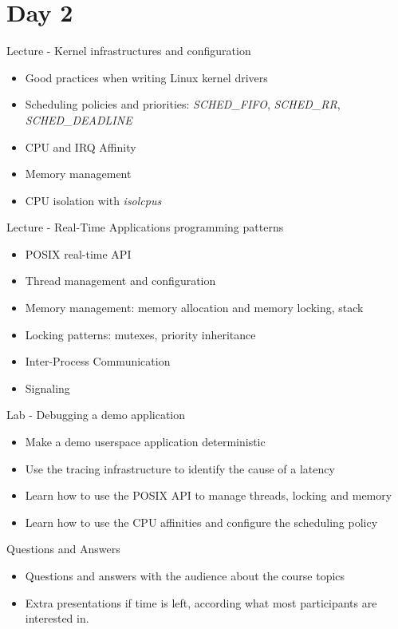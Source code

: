 \documentclass[a4paper,12pt,obeyspaces,spaces,hyphens]{article}
\begin{document}
\section{Day 2}

\feagendaonecolumn
{Lecture - Kernel infrastructures and configuration}
{
  \begin{itemize}
  \item Good practices when writing Linux kernel drivers
  \item Scheduling policies and priorities: {\em SCHED\_FIFO}, {\em
      SCHED\_RR}, {\em SCHED\_DEADLINE}
  \item CPU and IRQ Affinity
  \item Memory management
  \item CPU isolation with {\em isolcpus}
  \end{itemize}
}

\feagendatwocolumn
{Lecture - Real-Time Applications programming patterns}
{
  \begin{itemize}
  \item POSIX real-time API
  \item Thread management and configuration
  \item Memory management: memory allocation and memory locking, stack
  \item Locking patterns: mutexes, priority inheritance
  \item Inter-Process Communication
  \item Signaling
  \end{itemize}
}
{Lab - Debugging a demo application}
{
  \begin{itemize}
  \item Make a demo userspace application deterministic
  \item Use the tracing infrastructure to identify the cause of a latency
  \item Learn how to use the POSIX API to manage threads, locking and memory
  \item Learn how to use the CPU affinities and configure the scheduling policy
  \end{itemize}
}

\feagendaonecolumn
{Questions and Answers}
{
  \begin{itemize}
  \item Questions and answers with the audience about the course topics
  \item Extra presentations if time is left, according what most
        participants are interested in.
  \end{itemize}
}
\end{document}
